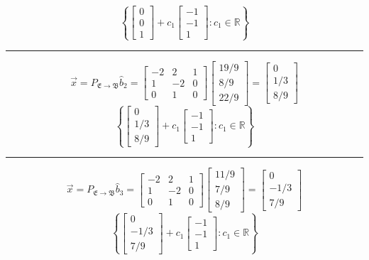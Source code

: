 \documentclass{report}
\begin{document}
$$
\left\{
\begin{bmatrix}0\\0\\1\end{bmatrix} + c_1\begin{bmatrix}-1\\-1\\1\end{bmatrix} : c_1 \in \mathbb{R}
\right\}
$$
\vspace{0.5em}
\hrule
\vspace{1em}
$$
\vec{x} = P_{\mathfrak{E}\rightarrow\mathfrak{B}}\hat{b}_2 = \begin{bmatrix}-2&2&1\\1&-2&0\\0&1&0\end{bmatrix}
\begin{bmatrix}19/9\\8/9\\22/9\end{bmatrix} = \begin{bmatrix}0\\1/3\\8/9\end{bmatrix}
$$
$$
\left\{
\begin{bmatrix}0\\1/3\\8/9\end{bmatrix} + c_1\begin{bmatrix}-1\\-1\\1\end{bmatrix} : c_1 \in \mathbb{R}
\right\}
$$
\vspace{0.5em}
\hrule
\vspace{1em}
$$
\vec{x} = P_{\mathfrak{E}\rightarrow\mathfrak{B}}\hat{b}_3 = \begin{bmatrix}-2&2&1\\1&-2&0\\0&1&0\end{bmatrix}
\begin{bmatrix}11/9\\7/9\\8/9\end{bmatrix} = \begin{bmatrix}0\\-1/3\\7/9\end{bmatrix}
$$
$$
\left\{
 \begin{bmatrix}0\\-1/3\\7/9\end{bmatrix}+ c_1\begin{bmatrix}-1\\-1\\1\end{bmatrix} : c_1 \in \mathbb{R}
\right\}
$$
\end{document}
